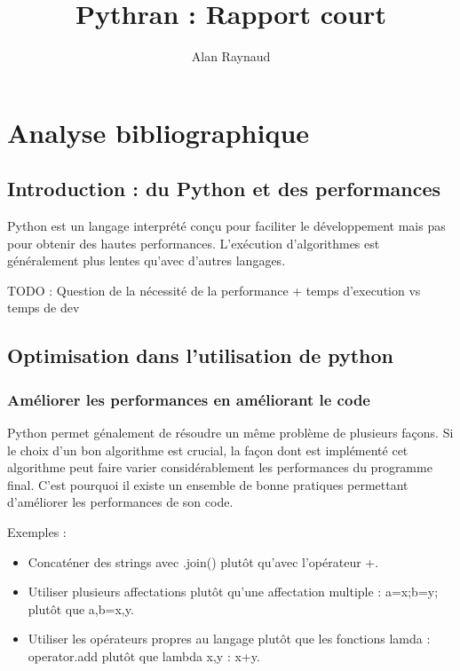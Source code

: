 \documentclass[a4paper]{article}
\title{Pythran : Rapport court}
\author{Alan Raynaud}
\date{}
\begin{document}

\maketitle                  

\tableofcontents            

\clearpage

\section{Analyse bibliographique}             

\subsection{Introduction : du Python et des performances}

Python est un langage interprété conçu pour faciliter le développement mais pas pour obtenir des hautes performances. L'exécution d'algorithmes est généralement plus lentes qu'avec d'autres langages\cite{PythonPerf}.

TODO : Question de la nécessité de la performance + temps d'execution vs temps de dev

\subsection{Optimisation dans l'utilisation de python}

\label{OptCode}

\subsubsection{Améliorer les performances en améliorant le code}

Python permet génalement de résoudre un même problème de plusieurs façons. Si le choix d'un bon algorithme est crucial, la façon dont est implémenté cet algorithme peut faire varier considérablement les performances du programme final. C'est pourquoi il existe un ensemble de bonne pratiques permettant d'améliorer les performances de son code\cite{PythonSpeed}.

Exemples :
\begin{itemize}
\item Concaténer des strings avec .join() plutôt qu'avec l'opérateur +.
\item Utiliser plusieurs affectations plutôt qu'une affectation multiple : a=x;b=y; plutôt que a,b=x,y.
\item Utiliser les opérateurs propres au langage plutôt que les fonctions lamda : operator.add plutôt que lambda x,y : x+y.
\end{itemize}
\end{document}
